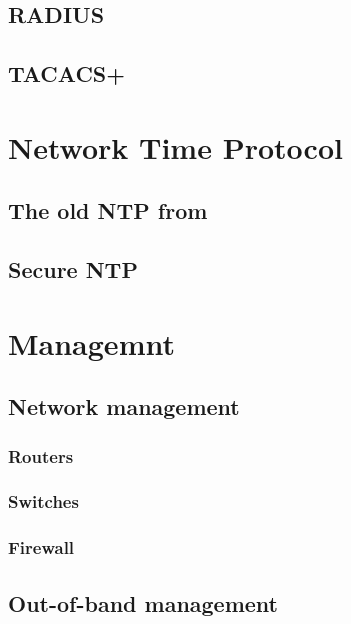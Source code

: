 \documentclass[a4paper,12pt,twoside,twocolumn,landscape]{book}
\begin{document}
\section{RADIUS}

\section{TACACS+}



\chapter{Network Time Protocol}

\section{The old NTP from }

\section{Secure NTP}


\chapter{Managemnt}

\section{Network management}

\subsection{Routers}

\subsection{Switches}

\subsection{Firewall}

\section{Out-of-band management}
\end{document}
